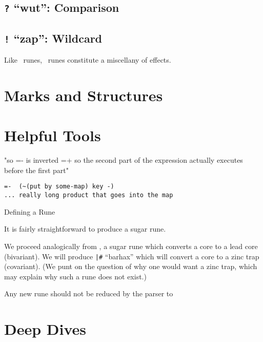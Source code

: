 \subsection{\texttt{?} “wut”:  Comparison}

\subsection{\texttt{!} “zap”:  Wildcard}

Like \mic~runes, \pzap~runes constitute a miscellany of effects.

\section{Marks and Structures}

\section{Helpful Tools}


"so =- is inverted =+ so the second part of the expression actually executes before the first part"

\begin{lstlisting}
=-  (~(put by some-map) key -)
... really long product that goes into the map
\end{lstlisting}

\begin{example}{Defining a Rune}

It is fairly straightforward to produce a sugar rune.

We proceed analogically from \pbarwut, a sugar rune which converts a core to a lead core (bivariant).  We will produce \texttt{|\#} “barhax” which will convert a core to a zinc trap (covariant).  (We punt on the question of why one would want a zinc trap, which may explain why such a rune does not exist.)

Any new rune should not be reduced by the parser to

\end{example}

\section{Deep Dives}

